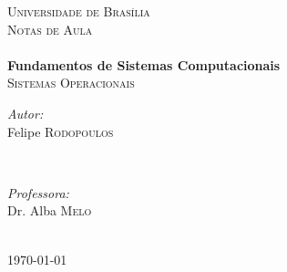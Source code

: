 \documentclass[a4paper, 11pt, twoside]{book}
\begin{document}
	\frontmatter

	\begin{titlepage}
		\thispagestyle{empty}
		\center

		\textsc{\LARGE Universidade de Brasília}\\[1.5cm] %
		\textsc{\Large Notas de Aula}\\[5cm] %

		\HRule \\[0.4cm]
		{\huge \bfseries Fundamentos de Sistemas Computacionais}\\[0.4cm]
		{\Large \textsc{Sistemas Operacionais}}
		\HRule \\[6.5cm]

		\begin{minipage}{0.4\textwidth}
		\begin{flushleft} \large
		\emph{Autor:}\\
		Felipe \textsc{Rodopoulos} %
		\end{flushleft}
		\end{minipage}
		~
		\begin{minipage}{0.4\textwidth}
		\begin{flushright} \large
		\emph{Professora:} \\
		Dr. Alba \textsc{Melo} %
		\end{flushright}
		\end{minipage}\\[2cm]

		\vfill
		{\large \today}\\[2cm]
	\end{titlepage}








	\restoregeometry

	\tableofcontents

	\mainmatter
	
	
	
	
	
	
	
	\nocite{*}

  \appendix
  
\end{document}
